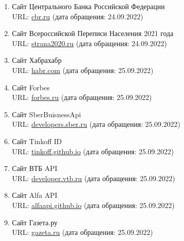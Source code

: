 \documentclass[a4paper,12pt]{article}
\begin{document}
    \begin{enumerate}
        \item {
            Сайт Центрального Банка Российской Федерации \\
            URL: \href{https://cbr.ru/statistics/nps/psrf/}{cbr.ru}
            (дата обращения: 24.09.2022)
        } \label{res:cbr}
        \item {
            Сайт Всероссийской Переписи Населения 2021 года \\
            URL: \href{https://www.strana2020.ru/novosti/opublikovany-pervye-dannye-perepisi-naseleniya/}{strana2020.ru}
            (дата обращения: 24.09.2022)
        } \label{res:strana2020}
        \item {
            Сайт Хабрахабр \\
            URL: \href{https://habr.com/ru/news/t/657567/?ysclid=l8hh4c5m1482599735}{habr.com}
            (дата обращения: 25.09.2022)
        } \label{res:habr_block}
        \item {
            Сайт Forbes \\
            URL: \href{https://www.forbes.ru/finansy/458195-visa-i-mastercard-priostanovili-rabotu-v-rossii-cto-eto-znacit}{forbes.ru}
            (дата обращения: 25.09.2022)
        } \label{res:forbes_block}
        \item {
            Сайт SberBuisnessApi \\
            URL: \href{https://developers.sber.ru/portal/products/sberbusiness-api?ysclid=l8hhwz7ikt281121203}{developers.sber.ru}
            (дата обращения: 25.09.2022)
        } \label{res:api_sber}
        \item {
            Сайт Tinkoff ID \\
            URL: \href{https://tinkoff.github.io/tinkoff-id/debit/}{tinkoff.github.io}
            (дата обращения: 25.09.2022)
        } \label{res:api_tinkoff}
        \item {
            Сайт ВТБ API \\
            URL: \href{https://developer.vtb.ru/?ysclid=l8hhqbnckn188330288}{developer.vtb.ru}
            (дата обращения: 25.09.2022)
        } \label{res:api_vtb}
        \item {
            Сайт Alfa API \\
            URL: \href{https://alfaapi.github.io/specification/#alfa-api}{alfaapi.github.io}
            (дата обращения: 25.09.2022)
        } \label{res:api_alfa}
        \item {
            Сайт Газета.ру \\
            URL: \href{https://www.gazeta.ru/business/news/2020/10/07/n_15047653.shtml?ysclid=l8hitymd0612071717}{gazeta.ru}
            (дата обращения: 25.09.2022)
        } \label{res:gazeta}
    \end{enumerate}
\end{document}
